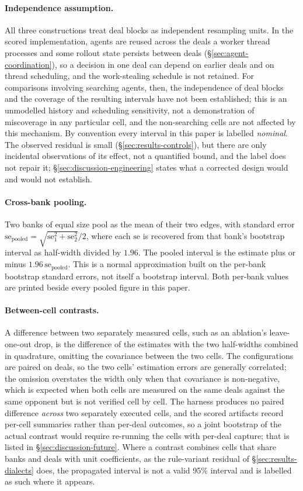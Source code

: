 \paragraph{Independence assumption.} All three constructions treat deal blocks as independent
  resampling units. In the scored implementation, agents are reused across the deals a worker
  thread processes and some rollout state persists between deals (\S\ref{sec:agent-coordination}),
  so a decision in one deal can depend on earlier deals and on thread scheduling, and the
  work-stealing schedule is not retained. For comparisons involving searching agents, then, the
  independence of deal blocks and the coverage of the resulting intervals have not been
  established; this is an unmodelled history and scheduling sensitivity, not a demonstration of
  miscoverage in any particular cell, and the non-searching cells are not affected by this
  mechanism. By convention every interval in this paper is labelled \emph{nominal}. The observed
  residual is small (\S\ref{sec:results-controls}), but there are only incidental observations of
  its effect, not a quantified bound, and the label does not repair it;
  \S\ref{sec:discussion-engineering} states what a corrected design would and would not establish.
\paragraph{Cross-bank pooling.} Two banks of equal size pool as the mean of their two edges, with
  standard error $\mathrm{se}_{\text{pooled}} = \sqrt{\mathrm{se}_1^2 + \mathrm{se}_2^2}/2$, where
  each $\mathrm{se}$ is recovered from that bank's bootstrap interval as half-width divided by
  $1.96$. The pooled interval is the estimate plus or minus $1.96\,\mathrm{se}_{\text{pooled}}$. This
  is a normal approximation built on the per-bank bootstrap standard errors, not itself a bootstrap
  interval. Both per-bank values are printed beside every pooled figure in this paper.
\paragraph{Between-cell contrasts.} A difference between two separately measured cells, such as an
  ablation's leave-one-out drop, is the difference of the estimates with the two half-widths
  combined in quadrature, omitting the covariance between the two cells. The configurations are
  paired on deals, so the two cells' estimation errors are generally correlated; the omission
  overstates the width only when that covariance is non-negative, which is expected when both cells
  are measured on the same deals against the same opponent but is not verified cell by cell. The
  harness produces no paired difference \emph{across} two separately executed cells, and the
  scored artifacts record per-cell summaries rather than per-deal outcomes, so a joint bootstrap of
  the actual contrast would require re-running the cells with per-deal capture; that is listed in
  \S\ref{sec:discussion-future}. Where a contrast combines cells that
  share banks and deals with unit coefficients, as the rule-variant residual of
  \S\ref{sec:results-dialects} does, the propagated interval is not a valid 95\% interval and is
  labelled as such where it appears.

